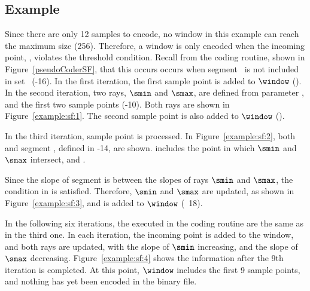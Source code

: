 \vspace{-17pt}
\subsection{Example}
\label{algo:sf:example}


\vspace{-3pt}
\exampleIntro{\ref{example:sf:1}}


Since there are only 12 samples to encode, no window in this example can reach the maximum size (256). Therefore, a window is only encoded when the incoming point, \point, violates the threshold condition. Recall from the coding routine, shown in Figure~\ref{pseudoCoderSF}, that this occurs occurs when segment \EseE\ is not included in set \segmentSet\ (-16). In the first iteration, the first sample point is added to $\window$ (). In the second iteration, two rays, $\smin$ and $\smax$, are defined from parameter \maxerror, and the first two sample points (-10). Both rays are shown in Figure~\ref{example:sf:1}. The second sample point is also added to $\window$ (). 




\clearpage


In the third iteration, sample point  is processed. In Figure~\ref{example:sf:2}, both  and segment , defined in -14, are shown.  includes the point in which $\smin$ and $\smax$ intersect, and .




Since the slope of segment  is between the slopes of rays $\smin$ and $\smax$, the condition in  is satisfied. Therefore, $\smin$ and $\smax$ are updated, as shown in Figure~\ref{example:sf:3}, and  is added to $\window$ (\Line~18). 




\clearpage


In the following six iterations, the \Lines executed in the coding routine are the same as in the third one. In each iteration, the incoming point is added to the window, and both rays are updated, with the slope of $\smin$ increasing, and the slope of $\smax$ decreasing. Figure~\ref{example:sf:4} shows the information after the 9th iteration is completed. At this point, $\window$ includes the first 9 sample points, and nothing has yet been encoded in the binary file. 


